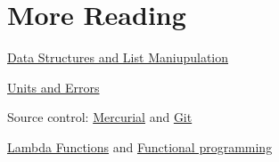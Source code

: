 \documentclass[justified, nobib]{tufte-handout}
\newcommand{\listTutorialLink}
  {https://docs.python.org/2/tutorial/datastructures.html}
\newcommand{\pintLink}{http://pint.readthedocs.org/en/0.6/}
\newcommand{\hgLink}{http://mercurial.selenic.com/}
\newcommand{\gitLink}{http://git-scm.com/}
\newcommand{\lambdaTutorialLink}
  {https://pythonconquerstheuniverse.wordpress.com/2011/08/29/lambda_tutorial/}
\newcommand{\functionalProgrammingLink}
  {http://www.ibm.com/developerworks/library/l-prog/}
\begin{document}
\pagebreak

\section*{More Reading}
\begin{description}
\item \href{\listTutorialLink}{Data Structures and List Maniupulation}

\item \href{\pintLink}{Units and Errors}

\item Source control: \href{\hgLink}{Mercurial} and \href{\gitLink}{Git}

\item \href{\lambdaTutorialLink}{Lambda Functions} and
  \href{\functionalProgrammingLink}{Functional programming}

\end{description}
\end{document}
